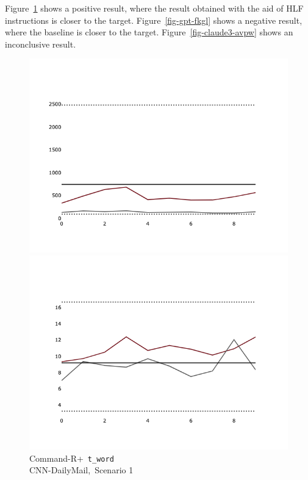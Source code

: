 \documentclass[a4paper,twoside]{article}
\begin{document}
Figure~\ref{fig-command-r-t-word} shows a positive result, where the result
obtained with the aid of HLF instructions is closer to the target.
Figure~\ref{fig-gpt-fkgl} shows a negative result, where the baseline is closer
to the target.
Figure~\ref{fig-claude3-avpw} shows an inconclusive result.

\begin{figure}[ht!]
    \centering
    \begin{minipage}{0.32\textwidth}
        \includegraphics[width=\linewidth]{plots/prompt_1/prompt_1-command_r-cnn_dailymail/prompt_1-command_r-cnn_dailymail_t_word.png}
        \caption{Command-R+~\texttt{t\_word}\\CNN-DailyMail,~Scenario 1}\label{fig-command-r-t-word}
    \end{minipage}
    \hfill
    \begin{minipage}{0.32\textwidth}
        \includegraphics[width=\linewidth]{plots/prompt_1/prompt_1-gpt-cnn_dailymail/prompt_1-gpt-cnn_dailymail_fkgl.png}

\end{minipage}
\end{figure}
\end{document}
